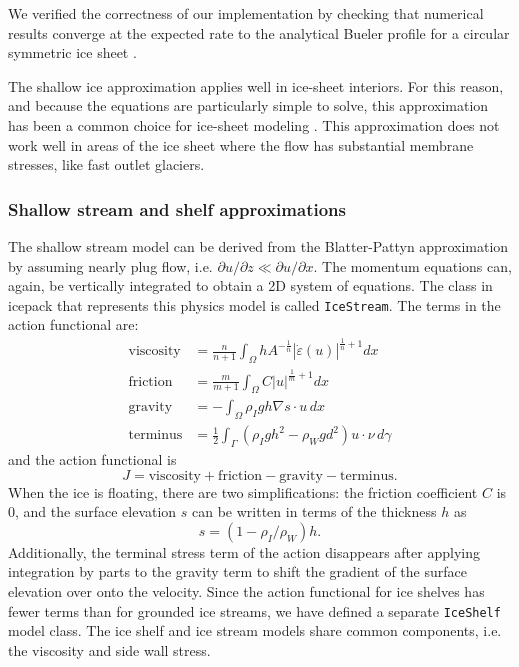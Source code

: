 \documentclass[journal abbreviation, manuscript]{copernicus}
\begin{document}
We verified the correctness of our implementation by checking that numerical results converge at the expected rate to the analytical Bueler profile for a circular symmetric ice sheet \citep{greve2009dynamics}.

The shallow ice approximation applies well in ice-sheet interiors.
For this reason, and because the equations are particularly simple to solve, this approximation has been a common choice for ice-sheet modeling \citep{cuffey2010physics, kirchner2016shallow}.
This approximation does not work well in areas of the ice sheet where the flow has substantial membrane stresses, like fast outlet glaciers.

\subsubsection{Shallow stream and shelf approximations}

The shallow stream model can be derived from the Blatter-Pattyn approximation by assuming nearly plug flow, i.e. $\partial u/\partial z \ll \partial u/\partial x$.
The momentum equations can, again, be vertically integrated to obtain a 2D system of equations.
The class in icepack that represents this physics model is called \texttt{IceStream}.
The terms in the action functional are:
\begin{align}
    \text{viscosity} & = \frac{n}{n + 1}\int_\Omega hA^{-\frac{1}{n}}|\dot\varepsilon(u)|^{\frac{1}{n} + 1}dx \\
    \text{friction} & = \frac{m}{m + 1}\int_\Omega C|u|^{\frac{1}{m} + 1}dx \\
    \text{gravity} & = -\int_\Omega\rho_I gh\nabla s\cdot u\,dx \\
    \text{terminus} & = \frac{1}{2}\int_\Gamma(\rho_I gh^2 - \rho_Wgd^2)u\cdot \nu\,d\gamma \label{eq:terminus-bc}
\end{align}
and the action functional is
\begin{equation}
    J = \text{viscosity} + \text{friction} - \text{gravity} - \text{terminus}.
\end{equation}
When the ice is floating, there are two simplifications: the friction coefficient $C$ is 0, and the surface elevation $s$ can be written in terms of the thickness $h$ as
\begin{equation}
    s = (1 - \rho_I / \rho_W)h.
\end{equation}
Additionally, the terminal stress term of the action disappears after applying integration by parts to the gravity term to shift the gradient of the surface elevation over onto the velocity.
Since the action functional for ice shelves has fewer terms than for grounded ice streams, we have defined a separate \texttt{IceShelf} model class.
The ice shelf and ice stream models share common components, i.e. the viscosity and side wall stress.
\end{document}
